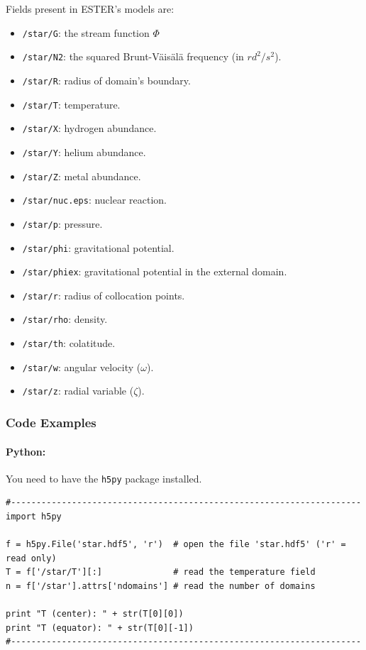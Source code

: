 Fields present in ESTER's models are: 
\begin{itemize}
    \item \texttt{/star/G}: the stream function $\Phi$
    \item \texttt{/star/N2}: the squared Brunt-Väisälä frequency (in $rd^2 /s^2$).
    \item \texttt{/star/R}: radius of domain's boundary.
    \item \texttt{/star/T}: temperature.
    \item \texttt{/star/X}: hydrogen abundance.
    \item \texttt{/star/Y}: helium abundance.
    \item \texttt{/star/Z}: metal abundance.
    \item \texttt{/star/nuc.eps}: nuclear reaction.
    \item \texttt{/star/p}: pressure.
    \item \texttt{/star/phi}: gravitational potential.
    \item \texttt{/star/phiex}: gravitational potential in the external domain.
    \item \texttt{/star/r}: radius of collocation points.
    \item \texttt{/star/rho}: density.
    \item \texttt{/star/th}: colatitude.
    \item \texttt{/star/w}: angular velocity ($\omega$).
    \item \texttt{/star/z}: radial variable ($\zeta$).
\end{itemize}

\subsubsection{Code Examples}

\paragraph{Python:}
You need to have the \texttt{h5py} package installed. 

\begin{verbatim}
#---------------------------------------------------------------------
import h5py

f = h5py.File('star.hdf5', 'r')  # open the file 'star.hdf5' ('r' = read only)
T = f['/star/T'][:]              # read the temperature field
n = f['/star'].attrs['ndomains'] # read the number of domains

print "T (center): " + str(T[0][0])
print "T (equator): " + str(T[0][-1])
#---------------------------------------------------------------------
\end{verbatim}

